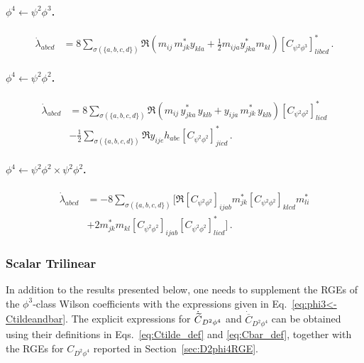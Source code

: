 \paragraph{\texorpdfstring{$\phi^4\leftarrow \psi^2\phi^3$}{quarticfrompsi2phi3}.}

\begin{align}
    \dot \lambda_{abcd} &= 8\sum_{\sigma(\{a,b,c,d\})} \Re{\left(m_{ij}\, m_{jk}^*y_{kla}+\frac{1}{2}m_{ija} y_{jka}^* m_{kl}\right)\left[C_{\psi^2\phi^3}\right]_{libcd}^*}\,.\label{quartic_psi2phi3}
\end{align}

\paragraph{\texorpdfstring{$\phi^4\leftarrow \psi^2\phi^2$}{quarticfrompsi2phi2}.}

\begin{align}
    \dot \lambda_{abcd} &= 8\sum_{\sigma(\{a,b,c,d\})} \Re{\left(m_{ij}\, y_{jka}^*\, y_{klb}+y_{ija}\, m_{jk}^*\, y_{klb}\right)\left[C_{\psi^2\phi^2}\right]_{licd}^*}\nonumber\\
    & -\frac{1}{2}\sum_{\sigma(\{a,b,c,d\})} \Re{y_{ije}h_{abe}\left[C_{\psi^2\phi^2}\right]_{jicd}^*}\,.\label{quartic_psi2phi2}
\end{align}

\paragraph{\texorpdfstring{$\phi^4\leftarrow \psi^2\phi^2\times\psi^2\phi^2$}{quarticfrompsi2phi2xpsi2phi2}.}

\begin{align}
    \dot \lambda_{abcd} &= -8 \sum_{\sigma(\{a,b,c,d\})}\Bigg[\Re{\left[C_{\psi^2\phi^2}\right]_{ijab} m^*_{jk} \left[C_{\psi^2\phi^2}\right]_{klcd} m^*_{li}}
    \nonumber\\
     &
     +2 m^*_{jk} m_{kl} \left[C_{\psi^2\phi^2}\right]_{ijab}\left[C_{\psi^2\phi^2}\right]^*_{licd}\Bigg]\,.\label{quartic_psi2phi2xpsi2phi2}
\end{align}

\subsubsection{Scalar Trilinear}

In addition to the results presented below, one needs to supplement the RGEs of the $\phi^3$-class Wilson coefficients with the expressions given in Eq.~\eqref{eq:phi3<-Ctildeandbar}.
The explicit expressions for $\dot{\widetilde{C}}_{D^2\phi^4}$ and $\dot{\overline C}_{D^2\phi^4}$ can be obtained using their definitions in Eqs.~\eqref{eq:Ctilde_def} and \eqref{eq:Cbar_def}, together with the RGEs for $C_{D^2\phi^4}$ reported in Section~\ref{sec:D2phi4RGE}.

